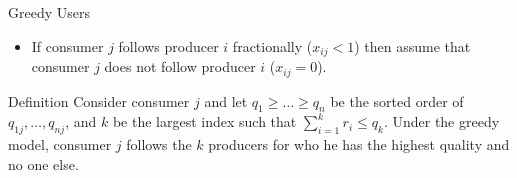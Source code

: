 \documentclass[aspectratio=169]{beamer}
\newcommand{\bi}{\begin{itemize}}
\newcommand{\ei}{\end{itemize}}
\begin{document}

\begin{frame}{Greedy Users}
    \bi
\item If consumer $j$ follows producer $i$ fractionally ($x_{ij} < 1$) then
    assume that consumer $j$ does not follow producer $i$ ($x_{ij} = 0$).
    \ei
    \pause
    \begin{block}{Definition}
        Consider consumer $j$ and let $q_1 \geq \ldots \geq q_n$ be the sorted
        order of $q_{1j},\ldots,q_{nj}$, and $k$ be the largest index such that
        $\sum_{i=1}^{k}r_i \leq q_k$. Under the greedy model, consumer $j$
        follows the $k$ producers for who he has the highest quality and no one
        else.
    \end{block}
\end{frame}
\end{document}
